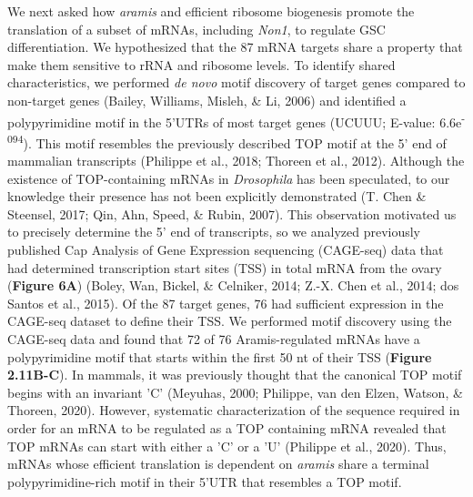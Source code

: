\documentclass[12pt,oneside]{reedthesis}
\begin{document}
We next asked how \emph{aramis} and efficient ribosome biogenesis promote the
translation of a subset of mRNAs, including \emph{Non1}, to regulate GSC
differentiation. We hypothesized that the 87 mRNA targets share a
property that make them sensitive to rRNA and ribosome levels. To
identify shared characteristics, we performed \emph{de novo} motif discovery
of target genes compared to non-target genes (Bailey, Williams, Misleh, \& Li, 2006) and
identified a polypyrimidine motif in the 5'UTRs of most target genes
(UCUUU; E-value: 6.6e\textsuperscript{-094}). This motif resembles the previously
described TOP motif at the 5' end of mammalian transcripts
(Philippe et al., 2018; Thoreen et al., 2012). Although the existence of
TOP-containing mRNAs in \emph{Drosophila} has been speculated, to our
knowledge their presence has not been explicitly demonstrated
(T. Chen \& Steensel, 2017; Qin, Ahn, Speed, \& Rubin, 2007). This observation motivated us to
precisely determine the 5' end of transcripts, so we analyzed previously
published Cap Analysis of Gene Expression sequencing (CAGE-seq) data that had determined
transcription start sites (TSS) in total mRNA from the ovary (\textbf{Figure
6A}) (Boley, Wan, Bickel, \& Celniker, 2014; Z.-X. Chen et al., 2014; dos Santos et al., 2015). Of the 87 target genes,
76 had sufficient expression in the CAGE-seq dataset to define their
TSS. We performed motif discovery using the CAGE-seq data and found that
72 of 76 Aramis-regulated mRNAs have a polypyrimidine motif that starts
within the first 50 nt of their TSS (\textbf{Figure 2.11B-C}). In mammals, it
was previously thought that the canonical TOP motif begins with an
invariant 'C' (Meyuhas, 2000; Philippe, van den Elzen, Watson, \& Thoreen, 2020). However, systematic
characterization of the sequence required in order for an mRNA to be
regulated as a TOP containing mRNA revealed that TOP mRNAs can start
with either a 'C' or a 'U' (Philippe et al., 2020). Thus,
mRNAs whose efficient translation is dependent on \emph{aramis} share a
terminal polypyrimidine-rich motif in their 5'UTR that resembles a TOP
motif.
\end{document}
